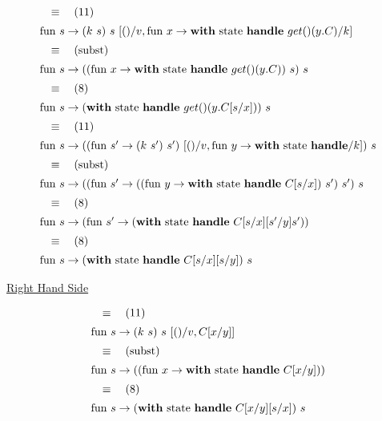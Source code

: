 \documentclass[logo,bsc,singlespacing,parskip]{infthesis}
\begin{document}
\[ 
\begin{array}{l}
\quad\equiv\quad (11) \\[5pt]
\text{fun } s \rightarrow (k\ s)\ s\ [()/v, \text{fun } x \rightarrow \text{\textbf{with} state \textbf{handle} } get()(y.C)/k] \\[5pt]
\quad\equiv\quad (\text{subst}) \\[5pt]
\text{fun } s \rightarrow ((\text{fun } x \rightarrow \text{\textbf{with} state \textbf{handle} } get()(y.C))\ s)\ s \\[5pt]
\quad\equiv\quad (8) \\[5pt]
\text{fun } s \rightarrow (\text{\textbf{with} state \textbf{handle} } get()(y.C[s/x]))\ s \\[5pt]
\quad\equiv\quad (11) \\[5pt]
\text{fun } s \rightarrow ((\text{fun } s'\rightarrow (k\ s')\ s')\ [()/v, \text{fun } y\rightarrow \text{\textbf{with} state \textbf{handle}}/k])\ s \\[5pt]
\quad\equiv\quad (\text{subst}) \\[5pt]
\text{fun } s \rightarrow ((\text{fun } s' \rightarrow (( \text{fun } y \rightarrow \text{\textbf{with} state \textbf{handle} } C[s/x])\ s')\ s')\ s \\[5pt]
\quad\equiv\quad (8) \\[5pt]
\text{fun } s \rightarrow (\text{fun } s' \rightarrow (\text{\textbf{with} state \textbf{handle} } C[s/x][s'/y]s')) \\[5pt]
\quad\equiv\quad (8) \\[5pt]
\text{fun } s \rightarrow (\text{\textbf{with} state \textbf{handle} } C[s/x][s/y])\ s
\end{array}
\]



\underline{Right Hand Side}

\[ 
\begin{array}{l}
\quad\equiv\quad (11) \\[5pt]
\text{fun } s \rightarrow (k\ s)\ s\ [()/v, C[x/y]] \\[5pt]
\quad\equiv\quad (\text{subst}) \\[5pt]
\text{fun } s \rightarrow ((\text{fun } x \rightarrow \text{\textbf{with} state \textbf{handle} } C[x/y])) \\[5pt]
\quad\equiv\quad (8) \\[5pt]
\text{fun } s \rightarrow (\text{\textbf{with} state \textbf{handle} } C[x/y][s/x])\ s
\end{array}
\]
\end{document}
